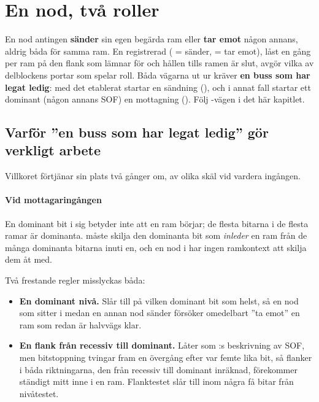 
\section{En nod, två roller}
\label{c16:sec:roles}

En nod antingen \textbf{sänder} sin egen begärda ram eller \textbf{tar emot} någon annans, aldrig
båda för samma ram. En registrerad  ( = sänder,  = tar emot), låst en
gång per ram på den flank som lämnar  för  och hållen tills ramen
är slut, avgör vilka av delblockens portar som spelar roll. Båda vägarna ut ur 
kräver \textbf{en buss som har legat ledig}: med det etablerat startar  en
sändning (), och i annat fall startar ett dominant  (någon annans
SOF) en mottagning (). Följ -vägen i det här kapitlet.

\subsection*{Varför ”en buss som har legat ledig” gör verkligt arbete}
Villkoret förtjänar sin plats två gånger om, av olika skäl vid vardera ingången.

\paragraph{Vid mottagaringången}
En dominant bit i sig betyder inte att en ram börjar; de flesta bitarna i de flesta ramar är
dominanta.  måste skilja den dominanta bit som \emph{inleder} en ram från de många
dominanta bitarna inuti en, och en nod i  har ingen ramkontext att skilja dem åt
med.

Två frestande regler misslyckas båda:
\begin{itemize}
  \item \textbf{En dominant nivå.} Slår till på vilken dominant bit som helst, så en nod som sitter i
     medan en annan nod sänder försöker omedelbart ”ta emot” en ram som redan är
    halvvägs klar.
  \item \textbf{En flank från recessiv till dominant.} Låter som :s
    beskrivning av SOF, men bitstoppning tvingar fram en övergång efter var femte lika bit, så
    flanker i båda riktningarna, den från recessiv till dominant inräknad, förekommer ständigt mitt
    inne i en ram. Flanktestet slår till inom några få bitar från nivåtestet.
\end{itemize}

